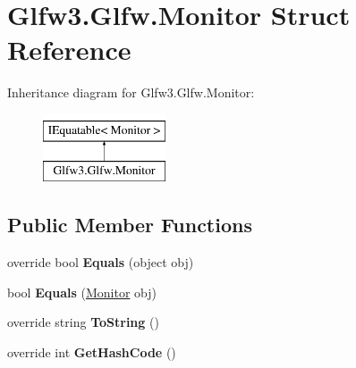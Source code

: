 \hypertarget{struct_glfw3_1_1_glfw_1_1_monitor}{}\section{Glfw3.\+Glfw.\+Monitor Struct Reference}
\label{struct_glfw3_1_1_glfw_1_1_monitor}


 


Inheritance diagram for Glfw3.\+Glfw.\+Monitor\+:\begin{figure}[H]
\begin{center}
\leavevmode
\includegraphics[height=2.000000cm]{struct_glfw3_1_1_glfw_1_1_monitor}
\end{center}
\end{figure}
\subsection*{Public Member Functions}
\begin{DoxyCompactItemize}
\item 
\mbox{\label{struct_glfw3_1_1_glfw_1_1_monitor_a2311e1f2fefcce6179c846fa28cfba9b}} 
override bool {\bfseries Equals} (object obj)
\item 
\mbox{\label{struct_glfw3_1_1_glfw_1_1_monitor_a91d4c8807a90c4b7ed459ac6652afe40}} 
bool {\bfseries Equals} (\mbox{\hyperlink{struct_glfw3_1_1_glfw_1_1_monitor}{Monitor}} obj)
\item 
\mbox{\label{struct_glfw3_1_1_glfw_1_1_monitor_a6be4ff39d4a5d307c9c3b8ce9b034f45}} 
override string {\bfseries To\+String} ()
\item 
\mbox{\label{struct_glfw3_1_1_glfw_1_1_monitor_a1a1b5015d2b769b6fb700b5923c1a57f}} 
override int {\bfseries Get\+Hash\+Code} ()
\end{DoxyCompactItemize}

